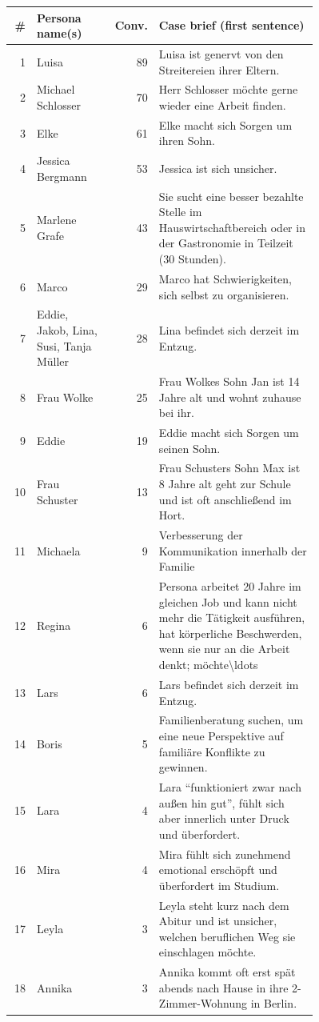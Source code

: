 \begin{tabular}{r p{0.24\linewidth} r p{0.52\linewidth}}
\toprule
\# & Persona name(s) & Conv. & Case brief (first sentence) \\
\midrule
1 & Luisa & 89 & Luisa ist genervt von den Streitereien ihrer Eltern. \\
2 & Michael Schlosser & 70 & Herr Schlosser m\"ochte gerne wieder eine Arbeit finden. \\
3 & Elke & 61 & Elke macht sich Sorgen um ihren Sohn. \\
4 & Jessica Bergmann & 53 & Jessica ist sich unsicher. \\
5 & Marlene Grafe & 43 & Sie sucht eine besser bezahlte Stelle im Hauswirtschaftbereich oder in der Gastronomie in Teilzeit (30 Stunden). \\
6 & Marco & 29 & Marco hat Schwierigkeiten, sich selbst zu organisieren. \\
7 & Eddie, Jakob, Lina, Susi, Tanja M\"uller & 28 & Lina befindet sich derzeit im Entzug. \\
8 & Frau Wolke & 25 & Frau Wolkes Sohn Jan ist 14 Jahre alt und wohnt zuhause bei ihr. \\
9 & Eddie & 19 & Eddie macht sich Sorgen um seinen Sohn. \\
10 & Frau Schuster & 13 & Frau Schusters Sohn Max ist 8 Jahre alt geht zur Schule und ist oft anschlie\ss{}end im Hort. \\
11 & Michaela & 9 & Verbesserung der Kommunikation innerhalb der Familie \\
12 & Regina & 6 & Persona arbeitet 20 Jahre im gleichen Job und kann nicht mehr die T\"atigkeit ausf\"uhren, hat k\"orperliche Beschwerden, wenn sie nur an die Arbeit denkt; m\"ochte\textbackslash{}ldots \\
13 & Lars & 6 & Lars befindet sich derzeit im Entzug. \\
14 & Boris & 5 & Familienberatung suchen, um eine neue Perspektive auf famili\"are Konflikte zu gewinnen. \\
15 & Lara & 4 & Lara ``funktioniert zwar nach au\ss{}en hin gut'', f\"uhlt sich aber innerlich unter Druck und \"uberfordert. \\
16 & Mira & 4 & Mira f\"uhlt sich zunehmend emotional ersch\"opft und \"uberfordert im Studium. \\
17 & Leyla & 3 & Leyla steht kurz nach dem Abitur und ist unsicher, welchen beruflichen Weg sie einschlagen m\"ochte. \\
18 & Annika & 3 & Annika kommt oft erst sp\"at abends nach Hause in ihre 2-Zimmer-Wohnung in Berlin. \\

\end{tabular}
